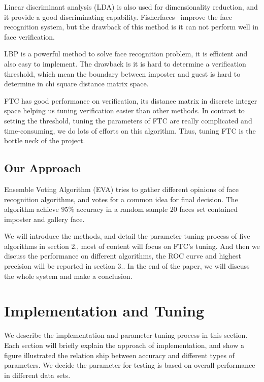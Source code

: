\documentclass[10pt,twocolumn,letterpaper]{article}
\begin{document}
Linear discriminant analysis (LDA) is also used for dimensionality reduction,
and it provide a good discriminating capability. Fisherfaces~\cite{Belhumeur1997}
improve the face recognition system, but the drawback of this method is it
can not perform well in face verification.

LBP is a powerful method to solve face recognition problem, it is efficient and
also easy to implement. The drawback is it is hard to determine a verification
threshold, which mean the boundary between imposter and guest is hard to 
determine in chi square distance matrix space.

FTC has good performance on verification, its distance matrix in discrete integer
space helping us tuning verification easier than other methods. In contrast to
setting the threshold, tuning the parameters of FTC are really complicated and 
time-consuming, we do lots of efforts on this algorithm.
Thus, tuning FTC is the bottle neck of the project.

\subsection{Our Approach}
Ensemble Voting Algorithm (EVA) tries to gather different opinions of face recognition
algorithms, and votes for a common idea for final decision. The algorithm 
achieve $95\%$ accuracy in a random sample $20$ faces set contained imposter and gallery face.

We will introduce the methods, and detail the parameter tuning process of 
five algorithms in section 2., most of content will focus on FTC's tuning. 
And then we discuss the performance on different algorithms, 
the ROC curve and highest precision will be reported in section 3.. 
In the end of the paper, we will discuss the whole system and make a conclusion.


\section{Implementation and Tuning}
We describe the implementation and parameter tuning process in this section.
Each section will briefly explain the approach of implementation, and show
a figure illustrated the relation ship between accuracy and different types
of parameters. We decide the parameter
for testing is based on overall performance in different data sets.
\end{document}
